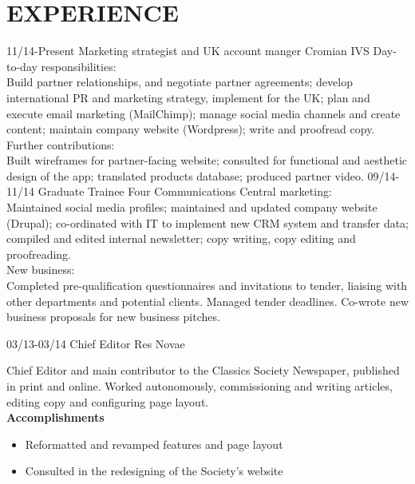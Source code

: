 \documentclass[]{friggeri-cv}
\begin{document}
\section{EXPERIENCE}

\begin{entrylist}
  \entry
  {11/14-Present}
  {Marketing strategist and UK account manger}
  {Cromian IVS}
  {Day-to-day responsibilities:\\
  	Build partner relationships, and negotiate partner agreements; develop international PR and marketing strategy, implement for the UK; plan and execute email marketing (MailChimp); manage social media channels and create content; maintain company website (Wordpress); write and proofread copy. \\
  	
  	Further contributions:\\
  	Built wireframes for partner-facing website; consulted for functional and aesthetic design of the app; translated products database; produced partner video.}
  \entry
  {09/14-11/14}
  {Graduate Trainee}
  {Four Communications}
  {Central marketing:\\
  	Maintained social media profiles; maintained and updated company website (Drupal); co-ordinated with IT to implement new CRM system and transfer data; compiled and edited internal newsletter; copy writing, copy editing and proofreading. \\
  	
  	New business:\\
  	Completed pre-qualification questionnaires and invitations to tender, liaising with other departments and potential clients. Managed tender deadlines. Co-wrote new business proposals for new business pitches.}
  
  \entry
    {03/13-03/14}
    {Chief Editor}
    {Res Novae}
    {Chief Editor and main contributor to the Classics Society Newspaper, published in print and online. Worked autonomously, commissioning and writing articles, editing copy and configuring page layout. \\
    \textbf{Accomplishments}
    \begin{itemize}
    	\item Reformatted and revamped features and page layout
    	\item Consulted in the redesigning of the Society's website
    \end{itemize}
    }   
   \end{entrylist}
\end{document}

